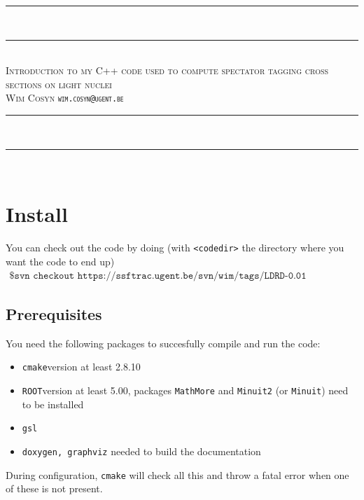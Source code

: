 \documentclass[11pt]{article}
\begin{document}
\begin{center}
\rule{\textwidth}{2pt} \\ [-0.8\baselineskip]
\rule{\textwidth}{1pt} \\ \vspace{8pt}
{\Large \textsc{Introduction to my C++ code used to compute spectator tagging 
cross sections on light nuclei}} \\
\vspace{10pt}
\textsc{Wim Cosyn \texttt{wim.cosyn@ugent.be}}
\end{center}
\rule{\textwidth}{1pt} \\ [-0.75\baselineskip]
\rule{\textwidth}{2pt} \\ [2\baselineskip]

\section{Install}
You can check out the code by doing (with \texttt{<codedir>} the directory 
where 
you want the code to end up)
\begin{align*}
	\texttt{\$ svn checkout https://ssftrac.ugent.be/svn/wim/tags/LDRD-0.01 
<codedir>}
\end{align*}

\subsection{Prerequisites}
You need the following packages to succesfully compile and run the code:
\begin{itemize}
 \item \texttt{cmake}\quad version at least 2.8.10
\item \texttt{ROOT}\quad version at least 5.00, packages \texttt{MathMore} and 
\texttt{Minuit2} (or \texttt{Minuit}) need to be installed
\item \texttt{gsl}
\item \texttt{doxygen, graphviz} \quad needed to build the documentation
\end{itemize}
During 
configuration, \texttt{cmake} will check all this and throw a fatal error 
when one of these is not present.
\end{document}
